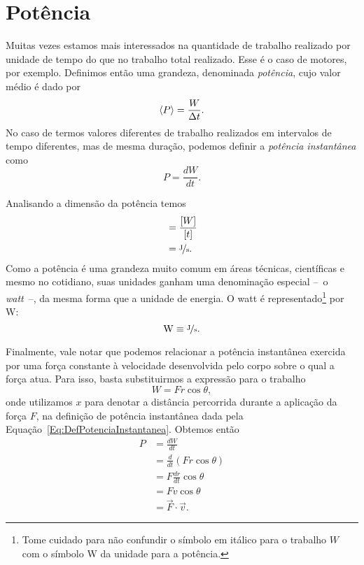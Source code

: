\section{Potência}

Muitas vezes estamos mais interessados na quantidade de trabalho realizado por unidade de tempo do que no trabalho total realizado. Esse é o caso de motores, por exemplo. Definimos então uma grandeza, denominada \emph{potência}, cujo valor médio é dado por
\begin{equation}
  \left\langle{P}\right\rangle = \frac{W}{\Delta t}.
\end{equation}
%
No caso de termos valores diferentes de trabalho realizados em intervalos de tempo diferentes, mas de mesma duração, podemos definir a \emph{potência instantânea} como
\begin{equation}\label{Eq:DefPotenciaInstantanea}
  P = \frac{dW}{dt}.
\end{equation}

Analisando a dimensão da potência temos
\begin{align}
  [P] &= \frac{[W]}{[t]} \\
  &= \nicefrac{\rm{J}}{\rm{s}}.
\end{align}
%
Como a potência é uma grandeza muito comum em áreas técnicas, científicas e mesmo no cotidiano, suas unidades ganham uma denominação especial --~o \emph{watt}~--, da mesma forma que a unidade de energia. O watt é representado\footnote{Tome cuidado para não confundir o símbolo em itálico para o trabalho $W$ com o símbolo W da unidade para a potência.} por W:
\begin{equation}
  \rm{W} \equiv \nicefrac{\rm{J}}{\rm{s}}.
\end{equation}

Finalmente, vale notar que podemos relacionar a potência instantânea exercida por uma força constante à velocidade desenvolvida pelo corpo sobre o qual a força atua. Para isso, basta substituirmos a expressão para o trabalho
\begin{equation}
  W = F r \cos \theta,
\end{equation}
%
onde utilizamos $x$ para denotar a distância percorrida durante a aplicação da força $F$, na definição de potência instantânea dada pela Equação~\ref{Eq:DefPotenciaInstantanea}. Obtemos então
\begin{align}
  P &= \frac{dW}{dt} \\
  &= \frac{d}{dt}(Fr\cos\theta) \\
  &= F\frac{dr}{dt} \cos\theta\\
  &= F v \cos\theta \\
  &= \vec{F}\cdot\vec{v}.
\end{align}

